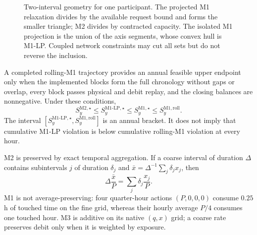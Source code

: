 \documentclass[10pt,journal]{IEEEtran}
\newcommand{\Mone}{\ensuremath{\mathrm{M1}}}
\newcommand{\MoneLP}{\ensuremath{\mathrm{M1\text{-}LP}}}
\newcommand{\Mtwo}{\ensuremath{\mathrm{M2}}}
\begin{document}
\begin{figure}[t]
\centering
{}
\caption{Two-interval geometry for one participant. The projected M1 relaxation divides by the available request bound and forms the smaller triangle; M2 divides by contracted capacity. The isolated M1 projection is the union of the axis segments, whose convex hull is M1-LP. Coupled network constraints may cut all sets but do not reverse the inclusion.}
\label{fig:geometry}
\end{figure}

A completed rolling-M1 trajectory provides an annual feasible upper endpoint only when the implemented blocks form the full chronology without gaps or overlap, every block passes physical and debit replay, and the closing balances are nonnegative. Under these conditions,
\begin{equation}
S_y^{\Mtwo,\star}
\leq S_y^{\MoneLP,\star}
\leq S_y^{\Mone,\star}
\leq S_y^{\Mone,\mathrm{roll}}.
\label{eq:annual_bracket}
\end{equation}
The interval $[S_y^{\MoneLP,\star},S_y^{\Mone,\mathrm{roll}}]$ is an annual bracket. It does not imply that cumulative M1-LP violation is below cumulative rolling-M1 violation at every hour.

M2 is preserved by exact temporal aggregation. If a coarse interval of duration $\Delta$ contains subintervals $j$ of duration $\delta_j$ and $\bar x=\Delta^{-1}\sum_j\delta_jx_j$, then
\begin{equation}
\Delta\frac{\bar x}{P}
=\sum_j\delta_j\frac{x_j}{P}.
\label{eq:m2_aggregation}
\end{equation}
M1 is not average-preserving: four quarter-hour actions $(P,0,0,0)$ consume $0.25$ h of touched time on the fine grid, whereas their hourly average $P/4$ consumes one touched hour. M3 is additive on its native $(q,x)$ grid; a coarse rate preserves debit only when it is weighted by exposure.
\end{document}
